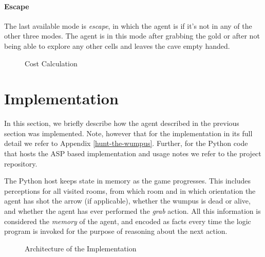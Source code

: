 \documentclass{llncs}
\begin{document}
\paragraph{Escape} The last available mode is \emph{escape}, in which the agent is if it's not in any of the other three modes. The agent is in this mode after grabbing the gold or after not being able to explore any other cells and leaves the cave empty handed.



\begin{figure}
\begin{center}

\end{center}
\caption{Cost Calculation}
\label{fig:graph}
\end{figure}

\section{Implementation}

In this section, we briefly describe how the agent described in the previous section was implemented. Note, however that for the implementation in its full detail we refer to Appendix \ref{hunt-the-wumpus}. Further, for the Python code that hosts the ASP based implementation and usage notes we refer to the project repository.

The Python host keeps state in memory as the game progresses. This includes perceptions for all visited rooms, from which room and in which orientation the agent has shot the arrow (if applicable), whether the wumpus is dead or alive, and whether the agent has ever performed the \emph{grab} action. All this information is considered the \emph{memory} of the agent, and encoded as facts every time the logic program is invoked for the purpose of reasoning about the next action.

\begin{figure}
\begin{center}

\end{center}
\caption{Architecture of the Implementation}
\label{fig:architecture}
\end{figure}
\end{document}
